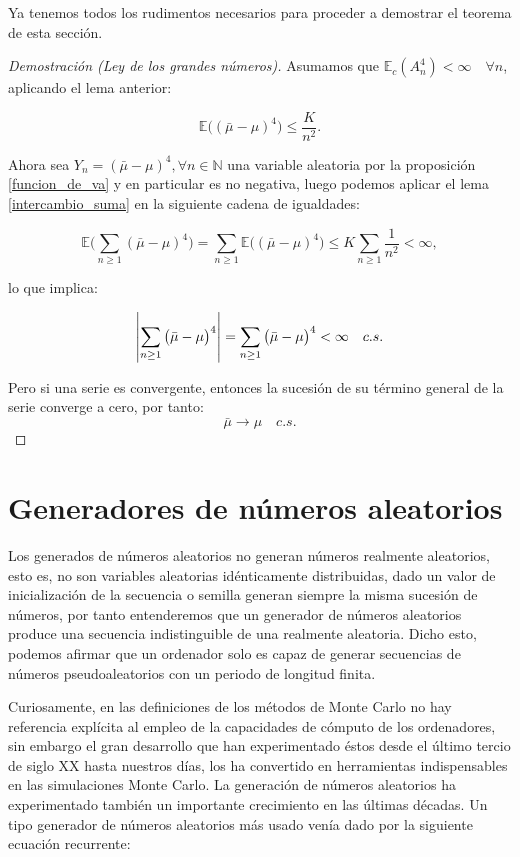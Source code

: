 \documentclass[../proyecto.tex]{memoir}
\begin{document}
Ya tenemos todos los rudimentos necesarios para proceder a demostrar el teorema de esta sección.

\begin{proof}[Demostración (Ley de los grandes números)]

Asumamos que $\mathds{E}_c( A_n^4) < \infty \quad \forall n$, aplicando el lema anterior:

$$
	\mathds{E} \big( ( \bar{ \mu } - \mu ) ^ 4 \big) \leq \frac{K}{n^{2}}.
$$

Ahora sea $Y_n = ( \bar{ \mu } - \mu ) ^ 4, \forall n \in \mathds{N}$ una variable aleatoria por la proposición \ref{funcion_de_va} y en particular es no negativa, luego podemos aplicar el lema \ref{intercambio_suma} en la siguiente cadena de igualdades:

$$
	\mathds{E} \big( \sum_{n \geq 1}( \bar{ \mu } - \mu ) ^ 4 \big) = \sum_{n \geq 1} \mathds{E} \big( ( \bar{ \mu } - \mu ) ^ 4 \big)  \leq K\sum_{n \geq 1}\frac{1}{n^{2}} < \infty,
$$

lo que implica:

$$
\abs{ \sum_{n \geq 1} \big( \bar{ \mu } - \mu \big)^ 4 } = \sum_{n \geq 1} \big( \bar{ \mu } - \mu \big)^ 4 < \infty \quad c.s. 
$$

Pero si una serie es convergente, entonces la sucesión de su término general de la serie converge a cero, por tanto:
$$
 \bar{ \mu } \to \mu \quad c.s.
$$
\end{proof}


\section{Generadores de números aleatorios}

Los generados de números aleatorios no generan números realmente aleatorios, esto es, no son variables aleatorias idénticamente distribuidas, dado un valor de inicialización de la secuencia o semilla generan siempre la misma sucesión de números, por tanto entenderemos que un generador de números aleatorios produce una secuencia indistinguible de una realmente aleatoria. Dicho esto, podemos afirmar que un ordenador solo es capaz de generar secuencias de números pseudoaleatorios con un periodo de longitud finita.

Curiosamente, en las definiciones de los métodos de Monte Carlo no hay referencia explícita al empleo de la capacidades de cómputo de los ordenadores, sin embargo el gran desarrollo que han experimentado éstos desde el último tercio de siglo XX hasta nuestros días, los ha convertido en herramientas indispensables en las simulaciones Monte Carlo. La generación de números aleatorios ha experimentado también un importante crecimiento en las últimas décadas. Un tipo generador de números aleatorios más usado venía dado por la siguiente ecuación recurrente:
\end{document}
